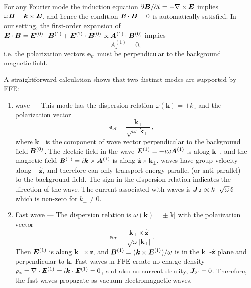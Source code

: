 For any Fourier mode the induction equation $\partial \boldsymbol{B}/\partial t=-\nabla\times\boldsymbol{E}$ implies $\omega\boldsymbol{B}=\boldsymbol{k}\times\boldsymbol{E}$, and hence the condition $\boldsymbol{E}\cdot\boldsymbol{B}=0$ is automatically satisfied. In our setting, the first-order expansion of $\boldsymbol{E}\cdot\boldsymbol{B} =\boldsymbol{E}^{(0)}\cdot\boldsymbol{B}^{(1)}+\boldsymbol{E}^{(1)}\cdot\boldsymbol{B}^{(0)}\propto \boldsymbol{A}^{(1)}\cdot\boldsymbol{B}^{(0)}$ implies
\begin{equation}
\label{eq:Az}
  A^{(1)}_z=0,
\end{equation}
i.e. the polarization vectors $\boldsymbol{e}_m$ must be perpendicular to the background magnetic field. 

A straightforward calculation shows that two distinct modes are supported by FFE:
%
\begin{enumerate}
	\item \alfven wave ---
	This mode has the dispersion relation $\omega(\boldsymbol{k})=\pm k_z$ and the polarization vector
	\begin{equation} \label{polA}
		\boldsymbol{e}_\mathcal{A} = \frac{\boldsymbol{k}_\perp}{\sqrt{\omega}|\boldsymbol{k}_\perp|}\,,
	\end{equation}
	where $\boldsymbol{k}_\perp$ is the component of wave vector perpendicular to the background field $\boldsymbol{B}^{(0)}$.
	The electric field in the wave $\boldsymbol{E}^{(1)}=-i\omega\boldsymbol{A}^{(1)}$ is along $\boldsymbol{k}_\perp$, and the magnetic field $\boldsymbol{B}^{(1)}=i\boldsymbol{k}\times\boldsymbol{A}^{(1)}$ is along $\hat{\boldsymbol{z}}\times\boldsymbol{k}_\perp$.
	\alfven waves have group velocity along $\pm \hat{\boldsymbol{z}}$, and therefore can only transport energy parallel (or anti-parallel) to the background field. The sign in the dispersion relation indicates the direction of the wave. The current associated with \alfven waves is
    $\boldsymbol{J}_{\mathcal{A}} \propto
    k_\perp \sqrt{\omega} \hat{\boldsymbol{z}}$, which is non-zero for $k_\perp \ne 0$.

	\item Fast wave ---
	The dispersion relation is $\omega(\boldsymbol{k})=\pm |\boldsymbol{k}|$ with the polarization vector
    \begin{equation} \label{polF}
	\boldsymbol{e}_\mathcal{F} = \frac{\boldsymbol{k}_\perp\times\hat{\boldsymbol{z}}}{\sqrt{\omega}|\boldsymbol{k}_\perp|} \, .
	\end{equation}
    Then $\boldsymbol{E}^{(1)}$ is along $\boldsymbol{k}_\perp\times\hat{\boldsymbol{z}}$, and $\boldsymbol{B}^{(1)}=(\boldsymbol{k}\times\boldsymbol{E}^{(1)})/\omega$ is in the $\boldsymbol{k}_\perp$-$\hat{\boldsymbol{z}}$ plane and perpendicular to $\boldsymbol{k}$.
	Fast waves in FFE create no charge density $\rho_e=\nabla\cdot \boldsymbol{E}^{(1)}=i\boldsymbol{k}\cdot \boldsymbol{E}^{(1)}=0$, and also no current density, $\boldsymbol{J}_{\mathcal{F}}=0$.
    Therefore, the fast waves propagate as vacuum electromagnetic waves.
\end{enumerate}

